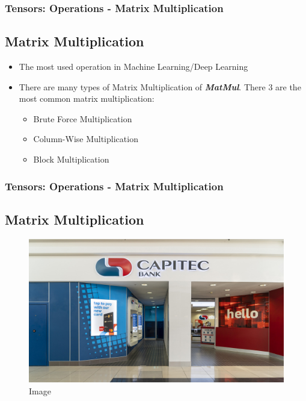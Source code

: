 \documentclass[11pt]{beamer}
\begin{document}
\begin{frame}
	\frametitle{Tensors: Operations - Matrix Multiplication}
	\subsection{Matrix Multiplication}
\begin{itemize}
	\item The most used operation in Machine Learning/Deep Learning
	\item There are many types of Matrix Multiplication of \textit{\textbf{MatMul}}. There 3 are the most common matrix multiplication:
	\begin{itemize}
		\item Brute Force Multiplication
		\item Column-Wise Multiplication
		\item Block Multiplication		
	\end{itemize}
\end{itemize}
\end{frame}

\begin{frame}
	\frametitle{Tensors: Operations - Matrix Multiplication}
	\subsection{Matrix Multiplication}
	\begin{figure}
		\includegraphics[scale=0.17]{"1 - original_image"}
		\caption{Image}
	\end{figure}
\end{frame}
\end{document}
